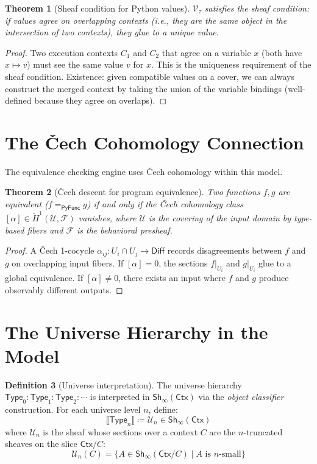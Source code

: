 \documentclass[11pt,a4paper]{report}
\theoremstyle{definition}
\newtheorem{definition}{Definition}[chapter]
\theoremstyle{plain}
\newtheorem{theorem}[definition]{Theorem}
\newcommand{\den}[1]{\llbracket #1 \rrbracket}
\newcommand{\Type}{\mathsf{Type}}
\newcommand{\PyFunc}{\mathsf{PyFunc}}
\newcommand{\defeq}{\coloneqq}
\newcommand{\Ctx}{\mathsf{Ctx}}
\newcommand{\Sh}{\mathsf{Sh}}
\begin{document}
\begin{theorem}[Sheaf condition for Python values]
$\mathcal{V}_\tau$ satisfies the sheaf condition: if values agree on overlapping
contexts (i.e., they are the same object in the intersection of two contexts),
they glue to a unique value.
\end{theorem}
\begin{proof}
Two execution contexts $C_1$ and $C_2$ that agree on a variable $x$ (both
have $x \mapsto v$) must see the same value $v$ for $x$.  This is the
uniqueness requirement of the sheaf condition.  Existence: given compatible
values on a cover, we can always construct the merged context by taking the
union of the variable bindings (well-defined because they agree on overlaps).
\end{proof}


\section{The Čech Cohomology Connection}

The equivalence checking engine uses Čech cohomology within this model.

\begin{theorem}[Čech descent for program equivalence]
Two functions $f, g$ are equivalent ($f =_{\PyFunc} g$) if and only if
the Čech cohomology class $[\alpha] \in \check{H}^1(\mathcal{U}, \mathcal{F})$
vanishes, where $\mathcal{U}$ is the covering of the input domain by
type-based fibers and $\mathcal{F}$ is the behavioral presheaf.
\end{theorem}
\begin{proof}
A Čech 1-cocycle $\alpha_{ij} : U_i \cap U_j \to \mathsf{Diff}$ records
disagreements between $f$ and $g$ on overlapping input fibers.  If $[\alpha] = 0$,
the sections $f|_{U_i}$ and $g|_{U_i}$ glue to a global equivalence.
If $[\alpha] \neq 0$, there exists an input where $f$ and $g$ produce
observably different outputs.
\end{proof}


\section{The Universe Hierarchy in the Model}

\begin{definition}[Universe interpretation]
\label{def:universe-hierarchy}
The universe hierarchy $\Type_0 : \Type_1 : \Type_2 : \cdots$ is interpreted
in $\Sh_\infty(\Ctx)$ via the \emph{object classifier} construction.  For each
universe level $n$, define:
\[
  \den{\Type_n} \defeq \mathcal{U}_n \in \Sh_\infty(\Ctx)
\]
where $\mathcal{U}_n$ is the sheaf whose sections over a context $C$ are the
$n$-truncated sheaves on the slice $\Ctx/C$:
\[
  \mathcal{U}_n(C) = \{A \in \Sh_\infty(\Ctx/C) \mid A \text{ is $n$-small}\}
\]
\end{definition}
\end{document}

